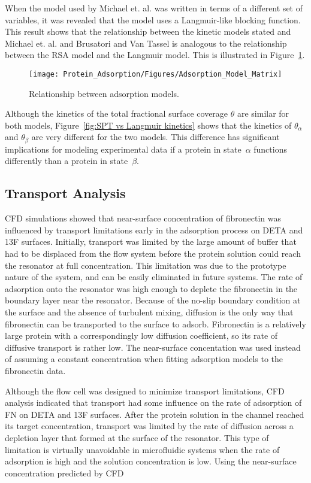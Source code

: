 When the model used by Michael et. al. \cite{Michael2003} was written
in terms of a different set of variables, it was revealed that the
model uses a Langmuir-like blocking function. This result shows that
the relationship between the kinetic models stated and Michael et.
al. and Brusatori and Van Tassel is analogous to the relationship
between the RSA model and the Langmuir model. This is illustrated
in Figure~\ref{fig:Adsorption Model Matrix}.%
\begin{figure}
\texttt{[image: Protein\_Adsorption/Figures/Adsorption\_Model\_Matrix]}

\caption{\label{fig:Adsorption Model Matrix}Relationship between adsorption
models.}


%
\end{figure}
 Although the kinetics of the total fractional surface coverage $\theta$
are similar for both models, Figure~\ref{fig:SPT vs Langmuir kinetics}
shows that the kinetics of $\theta_{\alpha}$ and $\theta_{\beta}$
are very different for the two models. This difference has significant
implications for modeling experimental data if a protein in state~$\alpha$
functions differently than a protein in state~$\beta$.


\subsection{Transport Analysis}

CFD simulations showed that near-surface concentration of fibronectin
was influenced by transport limitations early in the adsorption process
on DETA and 13F surfaces. Initially, transport was limited by the
large amount of buffer that had to be displaced from the flow system
before the protein solution could reach the resonator at full concentration.
This limitation was due to the prototype nature of the system, and
can be easily eliminated in future systems. The rate of adsorption
onto the resonator was high enough to deplete the fibronectin in the
boundary layer near the resonator. Because of the no-slip boundary
condition at the surface and the absence of turbulent mixing, diffusion
is the only way that fibronectin can be transported to the surface
to adsorb. Fibronectin is a relatively large protein with a correspondingly
low diffusion coefficient, so its rate of diffusive transport is rather
low. The near-surface concentation was used instead of assuming a
constant concentration when fitting adsorption models to the fibronectin
data.

Although the flow cell was designed to minimize transport limitations,
CFD analysis indicated that transport had some influence on the rate
of adsorption of FN on DETA and 13F surfaces. After the protein solution
in the channel reached its target concentration, transport was limited
by the rate of diffusion across a depletion layer that formed at the
surface of the resonator. This type of limitation is virtually unavoidable
in microfluidic systems when the rate of adsorption is high and the
solution concentration is low. Using the near-surface concentration
predicted by CFD 

